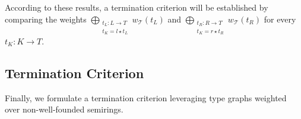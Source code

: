 According to these results, a termination criterion will be established by comparing the weights 
$\bigoplus_{\substack{t_L: L \rightarrow T\\ t_K = l \star t_L}}
        w_\mathcal{T}(t_L)$ and 
$\bigoplus_{\substack{t_R: R \rightarrow T\\ t_K = r \star t_R}} 
        w_\mathcal{T}(t_R)$ for every $t_K: K \rightarrow T$.
















\subsection{Termination Criterion}
\label{nwf:sec:proving_termination}
Finally, we formulate a termination criterion leveraging type graphs weighted over non-well-founded semirings. 
